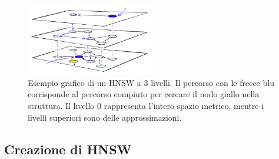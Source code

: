 \begin{figure}
    \centering
    \includegraphics*[width=0.5\textwidth]{img/hnsw.png}
    \caption{Esempio grafico di un HNSW a $3$ livelli. Il percorso con le frecce blu corrisponde 
    al percorso compiuto per cercare il nodo giallo nella struttura. 
    Il livello $0$ rappresenta l'intero spazio metrico, mentre i livelli superiori sono delle 
    approssimazioni. \cite{hnsw}}
    \label{fig:hnsw}
\end{figure}

\subsection{Creazione di HNSW}

